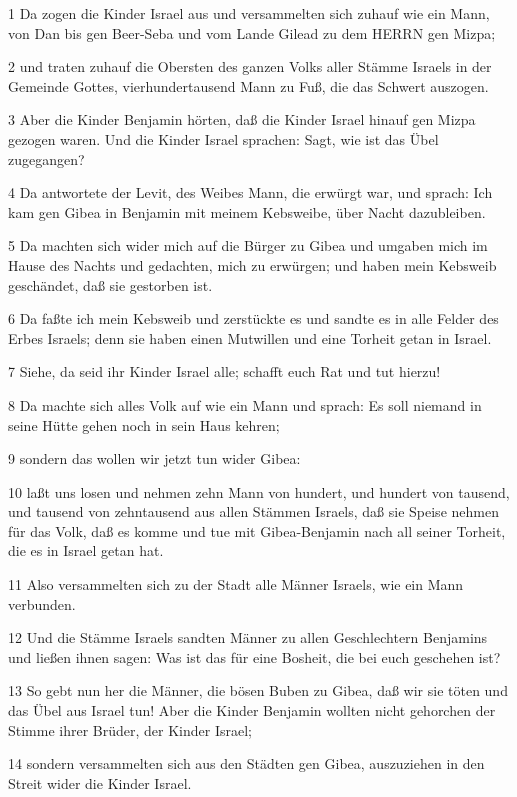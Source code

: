 \par 1 Da zogen die Kinder Israel aus und versammelten sich zuhauf wie ein Mann, von Dan bis gen Beer-Seba und vom Lande Gilead zu dem HERRN gen Mizpa;
\par 2 und traten zuhauf die Obersten des ganzen Volks aller Stämme Israels in der Gemeinde Gottes, vierhundertausend Mann zu Fuß, die das Schwert auszogen.
\par 3 Aber die Kinder Benjamin hörten, daß die Kinder Israel hinauf gen Mizpa gezogen waren. Und die Kinder Israel sprachen: Sagt, wie ist das Übel zugegangen?
\par 4 Da antwortete der Levit, des Weibes Mann, die erwürgt war, und sprach: Ich kam gen Gibea in Benjamin mit meinem Kebsweibe, über Nacht dazubleiben.
\par 5 Da machten sich wider mich auf die Bürger zu Gibea und umgaben mich im Hause des Nachts und gedachten, mich zu erwürgen; und haben mein Kebsweib geschändet, daß sie gestorben ist.
\par 6 Da faßte ich mein Kebsweib und zerstückte es und sandte es in alle Felder des Erbes Israels; denn sie haben einen Mutwillen und eine Torheit getan in Israel.
\par 7 Siehe, da seid ihr Kinder Israel alle; schafft euch Rat und tut hierzu!
\par 8 Da machte sich alles Volk auf wie ein Mann und sprach: Es soll niemand in seine Hütte gehen noch in sein Haus kehren;
\par 9 sondern das wollen wir jetzt tun wider Gibea:
\par 10 laßt uns losen und nehmen zehn Mann von hundert, und hundert von tausend, und tausend von zehntausend aus allen Stämmen Israels, daß sie Speise nehmen für das Volk, daß es komme und tue mit Gibea-Benjamin nach all seiner Torheit, die es in Israel getan hat.
\par 11 Also versammelten sich zu der Stadt alle Männer Israels, wie ein Mann verbunden.
\par 12 Und die Stämme Israels sandten Männer zu allen Geschlechtern Benjamins und ließen ihnen sagen: Was ist das für eine Bosheit, die bei euch geschehen ist?
\par 13 So gebt nun her die Männer, die bösen Buben zu Gibea, daß wir sie töten und das Übel aus Israel tun! Aber die Kinder Benjamin wollten nicht gehorchen der Stimme ihrer Brüder, der Kinder Israel;
\par 14 sondern versammelten sich aus den Städten gen Gibea, auszuziehen in den Streit wider die Kinder Israel.
